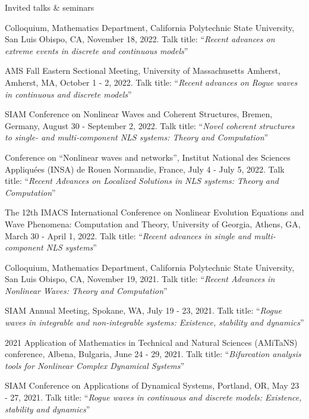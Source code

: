 \documentclass[10pt]{article} %
\begin{document}
\begin{section}{Invited talks \& seminars}
\begin{etaremune}
\item Colloquium, Mathematics Department, California Polytechnic State University, San Luis Obispo, CA, November 18, 2022. 
Talk title: ``\textit{Recent advances on extreme events in discrete and continuous models}''

\item AMS Fall Eastern Sectional Meeting, University of Massachusetts Amherst, Amherst, MA, October 1 - 2, 2022.
Talk title: ``\textit{Recent advances on Rogue waves in continuous and discrete models}''

\item SIAM Conference on Nonlinear Waves and Coherent Structures, Bremen, Germany, August 30 - September 2, 2022.
Talk title: ``\textit{Novel coherent structures to single- and multi-component NLS systems: Theory and Computation}''

\item Conference on ``Nonlinear waves and networks'', Institut National des Sciences Appliqu\'ees %
(INSA) de Rouen Normandie, France, July 4 - July 5, 2022. %
Talk title: ``\textit{Recent Advances on Localized Solutions in NLS systems: Theory and Computation}''

\item The 12th IMACS International Conference on Nonlinear Evolution Equations and Wave Phenomena: Computation and Theory, %
        University of Georgia, Athens, GA, March 30 - April 1, 2022. 
        Talk title: ``\textit{Recent advances in single and multi-component NLS systems}''

\item Colloquium, Mathematics Department, California Polytechnic State University, San Luis Obispo, CA, November 19, 2021. 
Talk title: ``\textit{Recent Advances in Nonlinear Waves: Theory and Computation}'' 
        
\item SIAM Annual Meeting, Spokane, WA, July 19 - 23, 2021. Talk title: 
``\textit{Rogue waves in integrable and non-integrable systems: Existence, stability and dynamics}''

\item 2021 Application of Mathematics in Technical and Natural Sciences (AMiTaNS) conference, Albena, Bulgaria, June 24 - 29, 2021.
Talk title: ``\textit{Bifurcation analysis tools for Nonlinear Complex Dynamical Systems}''

\item SIAM Conference on Applications of Dynamical Systems, Portland, OR, May 23 - 27, 2021. Talk title: 
``\textit{Rogue waves in continuous and discrete models: Existence, stability and dynamics}''


\end{etaremune}
\end{section}
\end{document}
